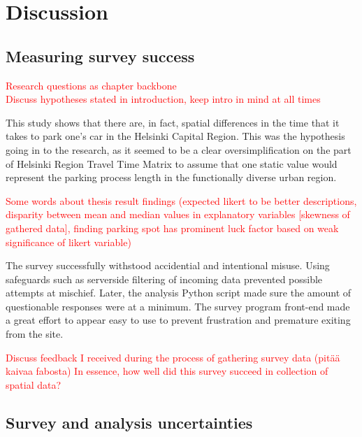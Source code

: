 \section{Discussion}
\subsection{Measuring survey success}
\justify

\textcolor{red}{Research questions as chapter backbone} \\
\textcolor{red}{Discuss hypotheses stated in introduction, keep intro in mind at all times}

This study shows that there are, in fact, spatial differences in the time that it takes to park one's car in the Helsinki Capital Region. This was the hypothesis going in to the research, as it seemed to be a clear oversimplification on the part of Helsinki Region Travel Time Matrix to assume that one static value would represent the parking process length in the functionally diverse urban region.

\textcolor{red}{Some words about thesis result findings (expected likert to be better descriptions, disparity between mean and median values in explanatory variables [skewness of gathered data], finding parking spot has prominent luck factor based on weak significance of likert variable)}

The survey successfully withstood accidential and intentional misuse. Using safeguards such as serverside filtering of incoming data prevented possible attempts at mischief. Later, the analysis Python script made sure the amount of questionable responses were at a minimum. The survey program front-end made a great effort to appear easy to use to prevent frustration and premature exiting from the site.

\textcolor{red}{Discuss feedback I received during the process of gathering survey data (pitää kaivaa fabosta) In essence, how well did this survey succeed in collection of spatial data?}

\newpage
\subsection{Survey and analysis uncertainties}
\justify

